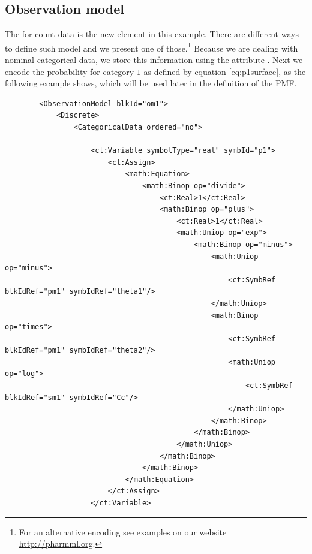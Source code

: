 \subsection{Observation model}
The  for count data is the new element in this example.
There are different ways to define such model and we present one of those.\footnote{For 
an alternative encoding see examples on our website \url{http://pharmml.org}.}
Because we are dealing with nominal categorical data, we store this information 
using the attribute . Next we encode the probability for category $1$ 
as defined by equation \ref{eq:p1surface}, as the following example shows, which 
will be used later in the definition of the PMF.
\lstset{language=XML}
\begin{lstlisting}
        <ObservationModel blkId="om1">
            <Discrete>
                <CategoricalData ordered="no">
                    
                    <ct:Variable symbolType="real" symbId="p1">
                        <ct:Assign>
                            <math:Equation>
                                <math:Binop op="divide">
                                    <ct:Real>1</ct:Real>
                                    <math:Binop op="plus">
                                        <ct:Real>1</ct:Real>
                                        <math:Uniop op="exp">
                                            <math:Binop op="minus">
                                                <math:Uniop op="minus">
                                                    <ct:SymbRef blkIdRef="pm1" symbIdRef="theta1"/>
                                                </math:Uniop>
                                                <math:Binop op="times">
                                                    <ct:SymbRef blkIdRef="pm1" symbIdRef="theta2"/>
                                                    <math:Uniop op="log">
                                                        <ct:SymbRef blkIdRef="sm1" symbIdRef="Cc"/>
                                                    </math:Uniop>
                                                </math:Binop>
                                            </math:Binop>
                                        </math:Uniop>
                                    </math:Binop>
                                </math:Binop>
                            </math:Equation>                            
                        </ct:Assign>
                    </ct:Variable>
\end{lstlisting}
